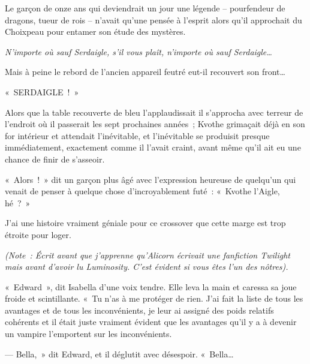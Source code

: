 
Le garçon de onze ans qui deviendrait un jour une légende -- pourfendeur de dragons, tueur de rois -- n'avait qu'une pensée à l'esprit alors qu'il approchait du Choixpeau pour entamer son étude des mystères.

\emph{N'importe où sauf Serdaigle, s'il vous plaît, n'importe où sauf Serdaigle…}

Mais à peine le rebord de l'ancien appareil feutré eut-il recouvert son front…

«~SERDAIGLE~!~»

Alors que la table recouverte de bleu l'applaudissait il s'approcha avec terreur de l'endroit où il passerait les sept prochaines années~; Kvothe grimaçait déjà en son for intérieur et attendait l'inévitable, et l'inévitable se produisit presque immédiatement, exactement comme il l'avait craint, avant même qu'il ait eu une chance de finir de s'asseoir.

«~Alors~!~» dit un garçon plus âgé avec l'expression heureuse de quelqu'un qui venait de penser à quelque chose d'incroyablement futé~: «~Kvothe l'Aigle, hé~?~»\footnotemark{}


J'ai une histoire vraiment géniale pour ce crossover que cette marge est trop étroite pour loger.


\emph{(Note~: Écrit avant que j'apprenne qu'Alicorn écrivait une fanfiction Twilight mais avant d'avoir lu {Luminosity}. C'est évident si vous êtes l'un des nôtres).}

«~Edward~», dit Isabella d'une voix tendre. Elle leva la main et caressa sa joue froide et scintillante. «~Tu n'as à me protéger de rien. J'ai fait la liste de tous les avantages et de tous les inconvénients, je leur ai assigné des poids relatifs cohérents et il était juste vraiment évident que les avantages qu'il y a à devenir un vampire l'emportent sur les inconvénients.

--- Bella,~» dit Edward, et il déglutit avec désespoir. «~Bella…

